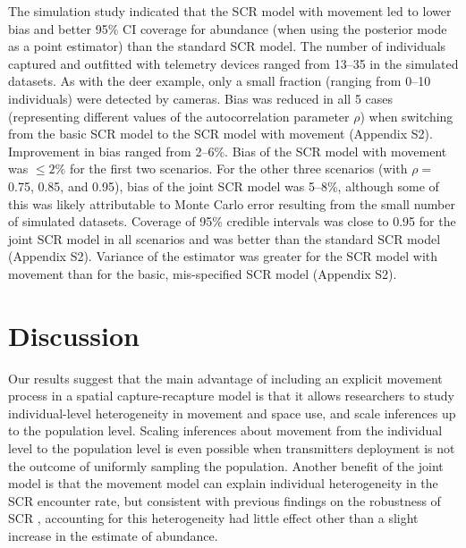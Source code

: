 \documentclass[12pt]{article}
\begin{document}
The simulation study indicated that the SCR model with movement led to
lower bias and better 95\% CI coverage for abundance (when using the
posterior mode as a point estimator) than the standard SCR model.
The number of individuals captured and outfitted with telemetry
devices ranged from 13--35 in the simulated datasets. As with the deer
example, only a small fraction (ranging from 0--10 individuals) were
detected by cameras. Bias was reduced in all 5 cases (representing different
values of the autocorrelation parameter $\rho$) when switching from
the basic SCR model to the SCR model with movement (Appendix
S2). Improvement in bias ranged from 2--6\%. Bias of the SCR model
with movement was $\le2\%$ for the first two
scenarios. For the other three scenarios (with 
$\rho=$0.75, 0.85, and 0.95), bias of the joint SCR model was
5--8\%, although some of this was likely attributable to Monte Carlo
error resulting from the small number of simulated datasets.
Coverage of 95\% credible intervals was close to 0.95 for
the joint SCR model in all scenarios and was better than the standard
SCR model (Appendix S2). Variance of the estimator was greater for the
SCR model with movement than for the basic, mis-specified SCR model
(Appendix S2).


\section{Discussion}


Our results suggest that the main advantage of including an explicit
movement process in a spatial capture-recapture model is that it
allows researchers to study individual-level heterogeneity in movement
and space use, and scale inferences up to the population
level. Scaling inferences about movement from the individual level to
the population 
level is even possible when transmitters deployment is not the outcome
of uniformly sampling the population. Another benefit of the joint
model is that the movement model can explain individual heterogeneity
in the SCR encounter rate, but consistent with previous findings on
the robustness of SCR \citep{efford_mowat:2014,royle_etal:2016},
accounting for this heterogeneity had little effect other than a
slight increase in the estimate of abundance. 
\end{document}
